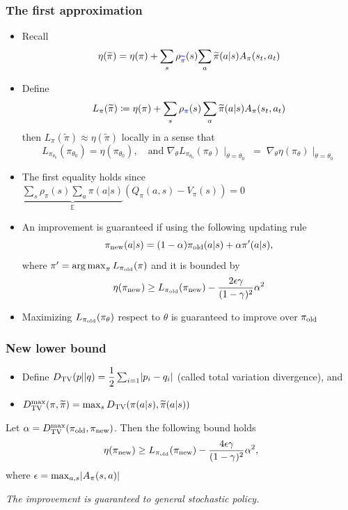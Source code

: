 \documentclass[9pt]{beamer}
\def\blue{\color{blue}}
\DeclarePairedDelimiter\abs{\lvert}{\rvert}%
\DeclareMathOperator*{\argmax}{arg\,max}
\theoremstyle{remark}
\begin{document}
\begin{frame}
    \frametitle{The first approximation}
\begin{itemize}
    \item Recall 
        \[ \eta(\widetilde{\pi}) = \eta(\pi) +  \sum_{s} \rho_{{\blue \widetilde{\pi}}}(s) { \sum_{a} \widetilde{\pi}(a|s) A_\pi(s_t, a_t)} \]
    \item Define 
        \[
            L_\pi(\widetilde{\pi}) \coloneqq \eta(\pi) + \sum_{s} \rho_{{\blue \pi} } (s)\sum_{a} \widetilde{\pi}(a|s) A_\pi (s_t, a_t)
        \] 
        then $L_\pi(\widetilde{\pi}) \approx \eta(\widetilde{\pi})$ locally in a sense that
        \[
            L_{\pi_{\theta_0}}(\pi_{\theta_0}) = \eta (\pi_{\theta_0}), \quad \text{and } \nabla_{\theta} L_{\pi_{\theta_0}}(\pi_{\theta})  \mid_{\theta = \theta_0} \; = \; \nabla_{\theta} \eta(\pi_{\theta}) \mid_{\theta = \theta_0}
        \] 
    \item The first equality holds since $ \underbrace{\sum_{s} \rho_{\pi}(s) \sum_{a} \pi(a|s)}_{ \mathbb{E}} (Q_\pi(a, s) - V_\pi(s)) = 0$
    \item An improvement is guaranteed if using the following updating rule 
        \[
            \pi_{\rm new} (a|s) = (1 - \alpha) \pi_{\rm old} (a|s) + \alpha \pi'(a|s),
        \] 
        where $\pi' = \argmax_{\pi} L_{\pi_{\rm old}}(\pi)$ and it is bounded by
        \[
            \eta(\pi_{\rm new}) \geq L_{\pi_{\rm old}} (\pi_{\rm new}) - \dfrac{2\epsilon \gamma }{(1- \gamma)^2} \alpha^2
        \] 
    \item Maximizing $L_{\pi_{\rm old}}(\pi_\theta)$ respect to $\theta$ is guaranteed to improve over $\pi_{\rm old}$
\end{itemize}
\end{frame}


\begin{frame}
    \frametitle{New lower bound}

\begin{itemize}
    \item Define $D_{\rm TV}(p || q) = \dfrac{1}{2} \sum_{i=1} \abs{p_i - q_i}$ (called total variation divergence), and
\item $D_{\rm TV}^{\max}(\pi, \widetilde{\pi}) = \max_s D_{\rm TV}(\pi( a| s ), \widetilde{\pi}(a|s))$
\end{itemize}

    \begin{theorem}
        Let $\alpha = D^{\rm max}_{\rm TV} (\pi_{\rm old}, \pi_{\rm new})$. Then the following bound holds
        \[
            \eta(\pi_{\rm new}) \geq L_{\pi_{\rm old}}(\pi_{\rm new}) - \dfrac{4\epsilon \gamma}{(1-\gamma)^2} \alpha^2, 
        \] 
        where $\epsilon = \max_{a,s} \abs{A_\pi(s, a)}$
    \end{theorem}

    \textit{The improvement is guaranteed to general stochastic policy.}
\end{frame}
\end{document}
